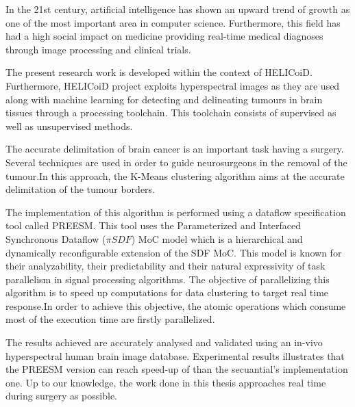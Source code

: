 In the 21st century, artificial intelligence has shown an upward trend of growth as one of the most important area in computer science. Furthermore, this field has had a high social impact on medicine providing real-time medical diagnoses through image processing and clinical trials. 

The present research work is developed within the context of HELICoiD. Furthermore, HELICoiD project exploits hyperspectral images as they are used along with machine learning for detecting and delineating tumours in brain tissues through a processing toolchain. This toolchain consists of supervised as well as unsupervised methods. 

The accurate delimitation of brain cancer is an important task having a surgery. Several techniques are used in order to guide neurosurgeons in the removal of the tumour.In this approach, the K-Means clustering algorithm aims at the accurate delimitation of the tumour borders. 

The implementation of this algorithm is performed using a dataflow specification tool called PREESM. This tool uses the Parameterized and Interfaced Synchronous Dataflow ($\pi SDF$) MoC model which is a hierarchical and dynamically reconfigurable extension of the SDF MoC. This model is known for their analyzability, their predictability and their natural expressivity of task parallelism in signal processing algorithms. The objective of parallelizing this algorithm is to speed up computations for data clustering to target real time response.In order to achieve this objective, the atomic operations which consume most of the execution time are firstly parallelized.

The results achieved are accurately analysed and validated using an in-vivo hyperspectral human brain image database. Experimental results illustrates that the PREESM version can reach speed-up of    than the secuantial's implementation one. Up to our knowledge, the work done in this thesis approaches real time during surgery as possible.

